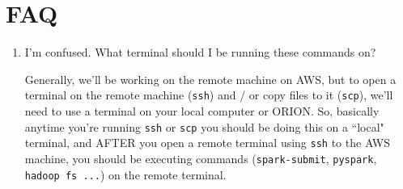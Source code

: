 \documentclass[11pt]{article}
\renewcommand\:{\colon} %
\begin{document}
\section{FAQ}

\begin{enumerate}
  \item I'm confused.  What terminal should I be running these commands on?

    Generally, we'll be working on the remote machine on AWS, but to open a
    terminal on the remote machine (\texttt{ssh}) and / or copy files to it
    (\texttt{scp}), we'll need to use a terminal on your local computer or
    ORION.  So, basically anytime you're running \texttt{ssh} or \texttt{scp}
    you should be doing this on a ``local" terminal, and AFTER you open a remote
    terminal using \texttt{ssh} to the AWS machine, you should be executing
    commands (\texttt{spark-submit}, \texttt{pyspark}, \texttt{hadoop fs ...})
    on the remote terminal.
\end{enumerate}
\end{document}
